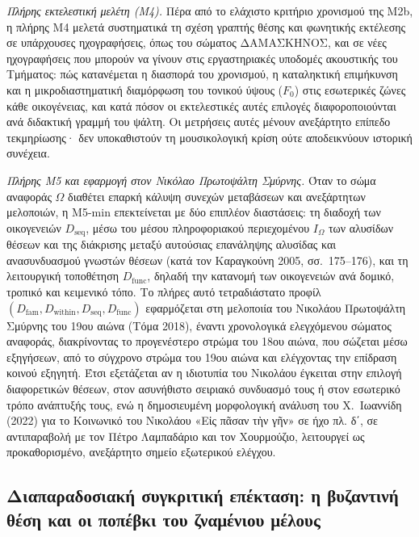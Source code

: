 \documentclass[11pt,a4paper]{article}
\begin{document}
\emph{Πλήρης εκτελεστική μελέτη (Μ4).} Πέρα από το ελάχιστο κριτήριο χρονισμού της Μ2b, η πλήρης Μ4 μελετά συστηματικά τη σχέση γραπτής θέσης και φωνητικής εκτέλεσης σε υπάρχουσες ηχογραφήσεις, όπως του σώματος ΔΑΜΑΣΚΗΝΟΣ, και σε νέες ηχογραφήσεις που μπορούν να γίνουν στις εργαστηριακές υποδομές ακουστικής του Τμήματος: πώς κατανέμεται η διασπορά του χρονισμού, η καταληκτική επιμήκυνση και η μικροδιαστηματική διαμόρφωση του τονικού ύψους ($F_0$) στις εσωτερικές ζώνες κάθε οικογένειας, και κατά πόσον οι εκτελεστικές αυτές επιλογές διαφοροποιούνται ανά διδακτική γραμμή του ψάλτη. Οι μετρήσεις αυτές μένουν ανεξάρτητο επίπεδο τεκμηρίωσης· δεν υποκαθιστούν τη μουσικολογική κρίση ούτε αποδεικνύουν ιστορική συνέχεια.

\emph{Πλήρης Μ5 και εφαρμογή στον Νικόλαο Πρωτοψάλτη Σμύρνης.} Όταν το σώμα αναφοράς $\Omega$ διαθέτει επαρκή κάλυψη συνεχών μεταβάσεων και ανεξάρτητων μελοποιών, η Μ5-min επεκτείνεται με δύο επιπλέον διαστάσεις: τη διαδοχή των οικογενειών $D_{\text{seq}}$, μέσω του μέσου πληροφοριακού περιεχομένου $I_\Omega$ των αλυσίδων θέσεων και της διάκρισης μεταξύ αυτούσιας επανάληψης αλυσίδας και ανασυνδυασμού γνωστών θέσεων (κατά τον Καραγκούνη 2005, σσ.~175--176), και τη λειτουργική τοποθέτηση $D_{\text{func}}$, δηλαδή την κατανομή των οικογενειών ανά δομικό, τροπικό και κειμενικό τόπο. Το πλήρες αυτό τετραδιάστατο προφίλ $(D_{\text{fam}},D_{\text{within}},D_{\text{seq}},D_{\text{func}})$ εφαρμόζεται στη μελοποιία του Νικολάου Πρωτοψάλτη Σμύρνης του 19ου αιώνα (Τόμα 2018), έναντι χρονολογικά ελεγχόμενου σώματος αναφοράς, διακρίνοντας το προγενέστερο στρώμα του 18ου αιώνα, που σώζεται μέσω εξηγήσεων, από το σύγχρονο στρώμα του 19ου αιώνα και ελέγχοντας την επίδραση κοινού εξηγητή. Έτσι εξετάζεται αν η ιδιοτυπία του Νικολάου έγκειται στην επιλογή διαφορετικών θέσεων, στον ασυνήθιστο σειριακό συνδυασμό τους ή στον εσωτερικό τρόπο ανάπτυξής τους, ενώ η δημοσιευμένη μορφολογική ανάλυση του Χ.~Ιωαννίδη (2022) για το Κοινωνικό του Νικολάου «Εἰς πᾶσαν τὴν γῆν» σε ήχο πλ. δ΄, σε αντιπαραβολή με τον Πέτρο Λαμπαδάριο και τον Χουρμούζιο, λειτουργεί ως προκαθορισμένο, ανεξάρτητο σημείο εξωτερικού ελέγχου.

\subsection{Διαπαραδοσιακή συγκριτική επέκταση: η βυζαντινή θέση και οι ποπέβκι του ζναμένιου μέλους}
\end{document}
